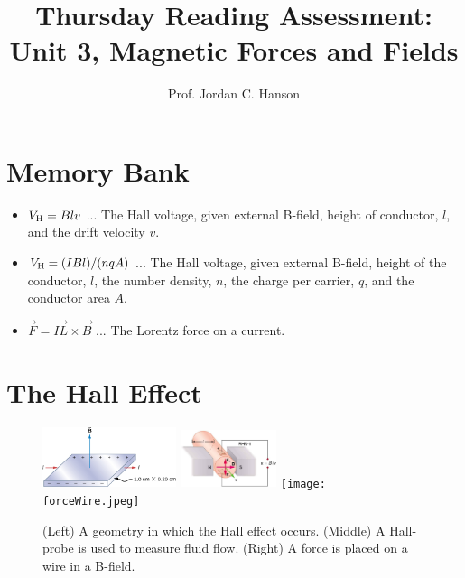 \documentclass{article}
\begin{document}
\title{Thursday Reading Assessment: Unit 3, Magnetic Forces and Fields}
\author{Prof. Jordan C. Hanson}

\maketitle

\section{Memory Bank}

\begin{itemize}
\item $V_{\rm H} = B l v$ ... The Hall voltage, given external B-field, height of conductor, $l$, and the drift velocity $v$.
\item $V_{\rm H} = (I B l)/(n q A)$ ... The Hall voltage, given external B-field, height of the conductor, $l$, the number density, $n$, the charge per carrier, $q$, and the conductor area $A$.
\item $\vec{F} = I\vec{L} \times \vec{B}$ ... The Lorentz force on a current.
\end{itemize}

\section{The Hall Effect}

\begin{figure}[ht]
\centering
\includegraphics[width=0.35\textwidth]{hall.jpeg}
\includegraphics[width=0.25\textwidth]{hall2.jpeg} \hspace{0.2cm}
\texttt{[image: forceWire.jpeg]}
\caption{\label{fig:hall} (Left) A geometry in which the Hall effect occurs. (Middle) A Hall-probe is used to measure fluid flow. (Right) A force is placed on a wire in a B-field.}
\end{figure}
\end{document}
